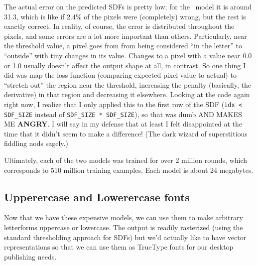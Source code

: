 \documentclass[twocolumn]{article}
\begin{document}
The actual error on the predicted SDFs is pretty low; for the
\makelowercase\ model it is around 31.3, which is like if 2.4\% of the
pixels were (completely) wrong, but the rest is exactly correct. In
reality, of course, the error is distributed throughout the pixels,
and some errors are a lot more important than others. Particularly,
near the threshold value, a pixel goes from from being considered ``in
the letter'' to ``outside'' with tiny changes in its value. Changes to
a pixel with a value near 0.0 or 1.0 usually doesn't affect the output
shape at all, in contrast. So one thing I did was map the loss
function (comparing expected pixel value to actual) to ``stretch out''
the region near the threshold, increasing the penalty (basically, the
derivative) in that region and decreasing it elsewhere. Looking at the
code again right now, I realize that I only applied this to the first
row of the SDF (\verb+idx < SDF_SIZE+ instead of
\verb+SDF_SIZE * SDF_SIZE+), so that was dumb AND MAKES ME {\bf
  ANGRY}. I will say in my defense that at least I felt disappointed
at the time that it didn't seem to make a difference! (The dark
wizard of superstitious fiddling nods sagely.)


Ultimately, each of the two models was trained for over 2 million
rounds, which corresponds to 510 million training examples. Each
model is about 24 megabytes.

\subsection{Upperercase and Lowerercase fonts} \label{sec:fonts}

Now that we have these expensive models, we can use them to make
arbitrary letterforms uppercase or lowercase. The output is readily
rasterized (using the standard thresholding approach for SDFs) but
we'd actually like to have vector representations so that we can
use them as TrueType fonts for our desktop publishing needs.
\end{document}
